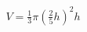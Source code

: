 \documentclass[preview]{standalone}
\begin{document}
\begin{align*}
V = \frac{1}{3} \pi \left( \frac{2}{5} h \right)^2 h
\end{align*}
\end{document}
